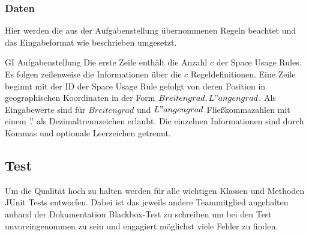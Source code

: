 \subsubsection{Daten}
\label{sec:Eingabedaten_GI}
Hier werden die aus der Aufgabenstellung übernommenen Regeln beachtet und das Eingabeformat wie beschrieben umgesetzt.
\begin{aquote}{GI Aufgabenstellung}
Die erste Zeile enthält die Anzahl $c$ der Space Usage Rules. Es folgen zeilenweise die Informationen
über die $c$ Regeldefinitionen.
Eine Zeile beginnt mit der ID der Space Usage Rule gefolgt von deren Position in geographischen
Koordinaten in der Form $Breitengrad, L"angengrad$. Als Eingabewerte sind für $Breitengrad$ und
$L"angengrad$ Fließkommazahlen mit einem ’.’ als Dezimaltrennzeichen erlaubt. Die einzelnen Informationen
sind durch Kommas und optionale Leerzeichen getrennt.
\end{aquote}

\subsection{Test}
Um die Qualität hoch zu halten werden für alle wichtigen Klassen und Methoden JUnit Tests
entworfen. Dabei ist das jeweils andere Teammitglied angehalten anhand der Dokumentation Blackbox-Test zu
schreiben um bei den Test unvoreingenommen zu sein und engagiert möglichst viele Fehler zu finden.
